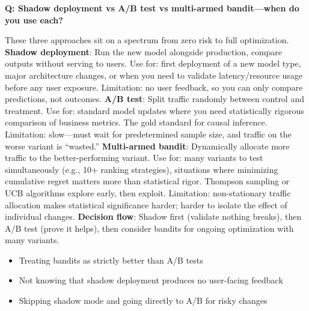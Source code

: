 \begin{interviewq}
\end{interviewq}

\begin{interviewq}
\textbf{Q: Shadow deployment vs A/B test vs multi-armed bandit---when do you use each?}

 \quad {} \quad \badgefreq{\freqhigh}

\stronganswer These three approaches sit on a spectrum from zero risk to full optimization. \textbf{Shadow deployment}: Run the new model alongside production, compare outputs without serving to users. Use for: first deployment of a new model type, major architecture changes, or when you need to validate latency/resource usage before any user exposure. Limitation: no user feedback, so you can only compare predictions, not outcomes. \textbf{A/B test}: Split traffic randomly between control and treatment. Use for: standard model updates where you need statistically rigorous comparison of business metrics. The gold standard for causal inference. Limitation: slow---must wait for predetermined sample size, and traffic on the worse variant is ``wasted.'' \textbf{Multi-armed bandit}: Dynamically allocate more traffic to the better-performing variant. Use for: many variants to test simultaneously (e.g., 10+ ranking strategies), situations where minimizing cumulative regret matters more than statistical rigor. Thompson sampling or UCB algorithms explore early, then exploit. Limitation: non-stationary traffic allocation makes statistical significance harder; harder to isolate the effect of individual changes. \textbf{Decision flow}: Shadow first (validate nothing breaks), then A/B test (prove it helps), then consider bandits for ongoing optimization with many variants.

\redflags
\begin{itemize}
    \item Treating bandits as strictly better than A/B tests
    \item Not knowing that shadow deployment produces no user-facing feedback
    \item Skipping shadow mode and going directly to A/B for risky changes
\end{itemize}



\end{interviewq}

